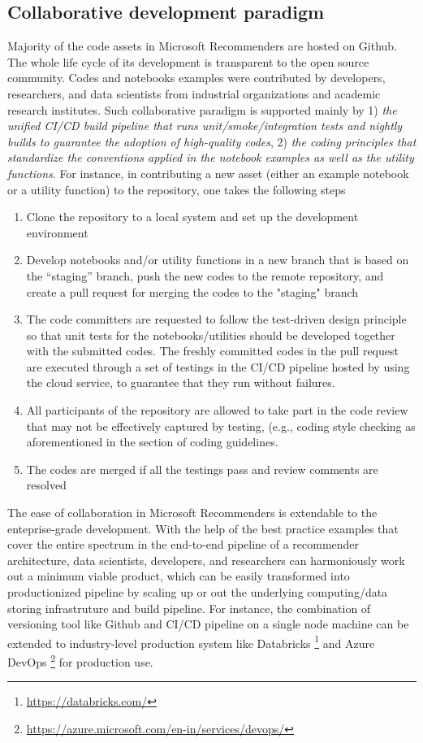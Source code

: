\subsection{Collaborative development paradigm} %
Majority of the code assets in Microsoft Recommenders are hosted on Github. The whole life cycle of its development is transparent to the open source community. Codes and notebooks examples were contributed by developers, researchers, and data scientists from industrial organizations and academic research institutes. Such collaborative paradigm is supported mainly by 1) \textit{the unified CI/CD build pipeline that runs unit/smoke/integration tests and nightly builds to guarantee the adoption of high-quality codes}, 2) \textit{the coding principles that standardize the conventions applied in the notebook examples as well as the utility functions}. For instance, in contributing a new asset (either an example notebook or a utility function) to the repository, one takes the following steps
\begin{enumerate}
    \item Clone the repository to a local system and set up the development environment
    \item Develop notebooks and/or utility functions in a new branch that is based on the ``staging'' branch, push the new codes to the remote repository, and create a pull request for merging the codes to the "staging" branch
    \item The code committers are requested to follow the test-driven design principle so that unit tests for the notebooks/utilities should be developed together with the submitted codes. The freshly committed codes in the pull request are executed through a set of testings in the CI/CD pipeline hosted by using the cloud service, to guarantee that they run without failures.
    \item All participants of the repository are allowed to take part in the code review that may not be effectively captured by testing, (e.g., coding style checking as aforementioned in the section of coding guidelines.  
    \item The codes are merged if all the testings pass and review comments are resolved
\end{enumerate}

The ease of collaboration in Microsoft Recommenders is extendable to the enteprise-grade development. With the help of the best practice examples that cover the entire spectrum in the end-to-end pipeline of a recommender architecture, data scientists, developers, and researchers can harmoniously work out a minimum viable product, which can be easily transformed into productionized pipeline by scaling up or out the underlying computing/data storing infrastruture and build pipeline. For instance, the combination of versioning tool like Github and CI/CD pipeline on a single node machine can be extended to industry-level production system like Databricks \footnote{\url{https://databricks.com/}} and Azure DevOps \footnote{\url{https://azure.microsoft.com/en-in/services/devops/}} for production use.